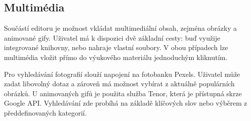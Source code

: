
\subsection{Multimédia}

Součástí editoru je možnost vkládat multimediální obsah, zejména obrázky a animované gify.
Uživatel má k dispozici dvě základní cesty: buď využije integrované knihovny, nebo nahraje vlastní soubory. 
V obou případech lze multimédia vložit přímo do výukového materiálu jednoduchým kliknutím.

Pro vyhledávání fotografií slouží napojení na fotobanku Pexels. 
Uživatel může zadat libovolný dotaz a zároveň má možnost vybírat z aktuálně populárních obrázků. 
U animovaných gifů je použita služba Tenor, která je přístupná skrze Google API. 
Vyhledávání zde probíhá na základě klíčových slov nebo výběrem z předdefinovaných kategorií.


